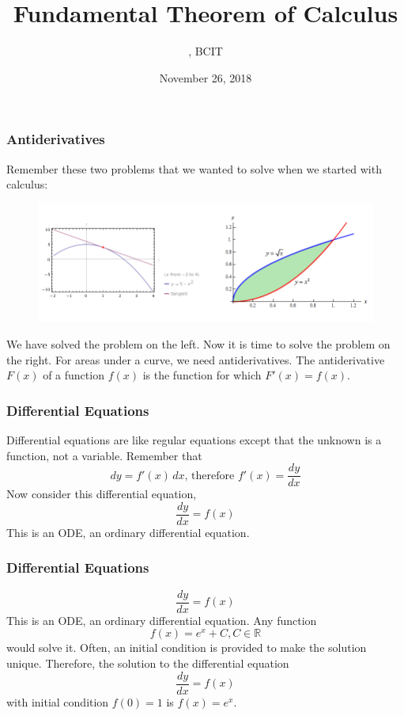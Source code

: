 \documentclass[xcolor=dvipsnames]{beamer}
\title{Fundamental Theorem of Calculus}
\subtitle{{\CourseNumber}, BCIT}
\author{\CourseName}
\date{November 26, 2018}
\begin{document}
\begin{frame}
  \titlepage
\end{frame}

\begin{frame}
  \frametitle{Antiderivatives}
Remember these two problems that we wanted to solve when we started
with calculus:
  \begin{figure}[h]
    \includegraphics[scale=.35]{./diagrams/regiontangent.png}
  \end{figure}
We have solved the problem on the left. Now it is time to solve the
problem on the right. For areas under a curve, we need
antiderivatives. The antiderivative $F(x)$ of a function $f(x)$ is the
function for which $F'(x)=f(x)$. 
\end{frame}

\begin{frame}
  \frametitle{Differential Equations}
Differential equations are like regular equations except that the
unknown is a function, not a variable. Remember that
\begin{equation}
  \label{eq:aiceiphe}
  dy=f'(x)\,dx\mbox{, therefore }f'(x)=\frac{dy}{dx}
\end{equation}
Now consider this differential equation,
\begin{equation}
  \label{eq:pheiwaot}
  \frac{dy}{dx}=f(x)
\end{equation}
This is an ODE, an \alert{ordinary differential equation}. 
\end{frame}

\begin{frame}
  \frametitle{Differential Equations}
\begin{equation}
  \label{eq:ahngohto}
  \frac{dy}{dx}=f(x)
\end{equation}
This is an ODE, an \alert{ordinary differential equation}. Any
function
\begin{equation}
  \label{eq:ogheigha}
  f(x)=e^{x}+C,C\in\mathbb{R}
\end{equation}
would solve it. Often, an \alert{initial condition} is provided to
make the solution unique. Therefore, the solution to the differential
equation
\begin{equation}
  \label{eq:joogeipo}
  \frac{dy}{dx}=f(x)
\end{equation}
with initial condition $f(0)=1$ is $f(x)=e^{x}$.
\end{frame}
\end{document}
